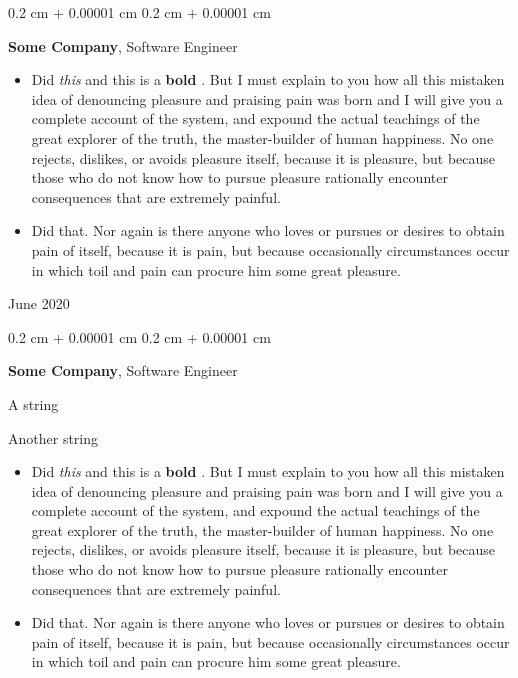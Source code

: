 \documentclass[10pt, letterpaper]{article}
\newenvironment{summary}{
    \begin{description}[
        topsep=0.10 cm,
        parsep=0.10 cm,
        partopsep=0pt,
        itemsep=0pt,
        leftmargin=0.4 cm + 10pt
    ]
}{
    \end{description}
} %
\newenvironment{highlights}{
    \begin{itemize}[
        topsep=0.10 cm,
        parsep=0.10 cm,
        partopsep=0pt,
        itemsep=0pt,
        leftmargin=0.4 cm + 10pt
    ]
}{
    \end{itemize}
} %
\newenvironment{onecolentry}{
    \begin{adjustwidth}{
        0.2 cm + 0.00001 cm
    }{
        0.2 cm + 0.00001 cm
    }
}{
    \end{adjustwidth}
} %
\newenvironment{twocolentry}[2][]{
    \onecolentry
    \def\secondColumn{#2}
    \setcolumnwidth{\fill, 4.5 cm}
    \begin{paracol}{2}
}{
    \switchcolumn \raggedleft \secondColumn
    \end{paracol}
    \endonecolentry
} %
\let\hrefWithoutArrow\href
\renewcommand{\href}[2]{\hrefWithoutArrow{#1}{\ifthenelse{\equal{#2}{}}{ }{#2 }\raisebox{.15ex}{\footnotesize \faExternalLink*}}}
\begin{document}
        \vspace{0.2 cm}

        \begin{twocolentry}{
            June 2020
        }
            \textbf{Some \textnormal{Company}}, Software Engineer
            \begin{highlights}
                \item Did \textit{this} and this is a \textbf{bold} \href{https://example.com}{link}. But I must explain to you how all this mistaken idea of denouncing pleasure and praising pain was born and I will give you a complete account of the system, and expound the actual teachings of the great explorer of the truth, the master-builder of human happiness. No one rejects, dislikes, or avoids pleasure itself, because it is pleasure, but because those who do not know how to pursue pleasure rationally encounter consequences that are extremely painful.
                \item Did that. Nor again is there anyone who loves or pursues or desires to obtain pain of itself, because it is pain, but because occasionally circumstances occur in which toil and pain can procure him some great pleasure.
            \end{highlights}
        \end{twocolentry}


        \vspace{0.2 cm}

        \begin{onecolentry}
            \textbf{Some \textnormal{Company}}, Software Engineer
            \begin{summary}
                \item A string
                \item Another string
            \end{summary}
            \begin{highlights}
                \item Did \textit{this} and this is a \textbf{bold} \href{https://example.com}{link}. But I must explain to you how all this mistaken idea of denouncing pleasure and praising pain was born and I will give you a complete account of the system, and expound the actual teachings of the great explorer of the truth, the master-builder of human happiness. No one rejects, dislikes, or avoids pleasure itself, because it is pleasure, but because those who do not know how to pursue pleasure rationally encounter consequences that are extremely painful.
                \item Did that. Nor again is there anyone who loves or pursues or desires to obtain pain of itself, because it is pain, but because occasionally circumstances occur in which toil and pain can procure him some great pleasure.
            \end{highlights}
        \end{onecolentry}
\end{document}
